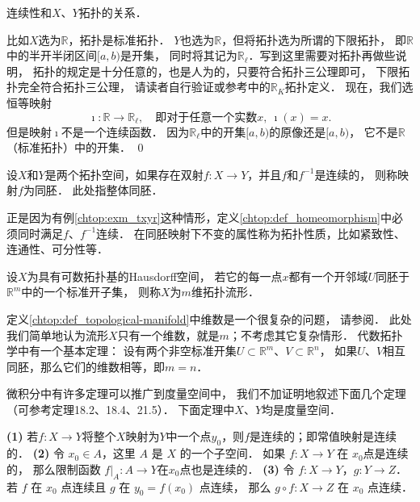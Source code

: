 \begin{example}\label{chtop:exm_txyr}
    连续性和$X$、$Y$拓扑的关系．
\end{example}
比如$X$选为$\mathbb{R}$，拓扑是{\kaishu 标准拓扑}．
$Y$也选为$\mathbb{R}$，但将拓扑选为所谓的{\kaishu 下限拓扑}，
即$\mathbb{R}$中的半开半闭区间$[a,b)$是开集，
同时将其记为$\mathbb{R}_\ell$．写到这里需要对拓扑再做些说明，
拓扑的规定是十分任意的，也是人为的，只要符合拓扑三公理即可，
下限拓扑完全符合拓扑三公理，
请读者自行验证或参考\parencite[\S 13]{munkres-2000-topology}中的$\mathbb{R}_K$拓扑定义．
现在，我们选恒等映射
\begin{equation}
    \imath : \mathbb{R} \to \mathbb{R}_\ell,\quad
    \text{即对于任意一个实数}x,\  \imath(x) =x .
\end{equation}
但是映射$\imath${\kaishu 不是}一个连续函数．
因为$\mathbb{R}_\ell$中的开集$[a,b)$的原像还是$[a,b)$，
它不是$\mathbb{R}$（标准拓扑）中的开集． \qed

\begin{definition}\label{chtop:def_homeomorphism}
    设$X$和$Y$是两个拓扑空间，如果存在双射$f:X\to Y$，并且$f$和$f^{-1}$是连续的，
    则称映射$f$为{\heiti 同胚}． 此处指整体同胚．  
\end{definition}


正是因为有例\ref{chtop:exm_txyr}这种情形，定义\ref{chtop:def_homeomorphism}中必须同时满足$f$、$f^{-1}$连续．
在同胚映射下不变的属性称为{\heiti 拓扑性质}，比如紧致性、连通性、可分性等．

\begin{definition}\label{chtop:def_topological-manifold}
    设$X$为具有可数拓扑基的Hausdorff空间，
    若它的每一点$x$都有一个开邻域$U$同胚于$\mathbb{R}^m$中的一个标准开子集，
    则称$X$为$m$维{\heiti 拓扑流形}．
\end{definition}

定义\ref{chtop:def_topological-manifold}中{\kaishu 维数}是一个很复杂的问题，
请参阅\parencite[\S 50]{munkres-2000-topology}．
此处我们简单地认为流形$X$只有一个维数，就是$m$；不考虑其它复杂情形．
代数拓扑学中有一个基本定理：  %
设有两个非空标准开集$U\subset \mathbb{R}^m$、$V\subset \mathbb{R}^n$，
如果$U$、$V$相互同胚，那么它们的维数相等，即$m=n$．


微积分中有许多定理可以推广到度量空间中，
我们不加证明地叙述下面几个定理（可参考\parencite{munkres-2000-topology}定理18.2、18.4、21.5）．
下面定理中$X$、$Y$均是度量空间．

\begin{theorem}
    {\bfseries (1)} 若$f:X\to Y$将整个$X$映射为$Y$中一个点$y_0$，则$f$是连续的；即常值映射是连续的．
    {\bfseries (2)} 令 $x_0 \in A$，这里 $A$ 是 $X$ 的一个子空间．
    如果 $f: X \rightarrow Y$ 在 $x_0$点是连续的，
    那么限制函数 $\left.f\right|_A: A \rightarrow Y$在$x_0$点也是连续的．
    {\bfseries (3)} 令 $f: X \rightarrow Y$，$g: Y \rightarrow Z$．
    若 $f$ 在 $x_0$ 点连续且 $g$ 在 $y_0=f\left(x_0\right)$ 点连续，
    那么 $g \circ f: X \rightarrow Z$ 在 $x_0$ 点连续．
\end{theorem}


